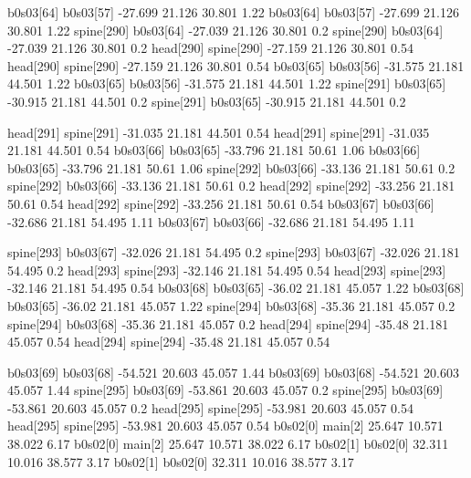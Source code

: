 b0s03[64]    b0s03[57]    -27.699    21.126    30.801    1.22
b0s03[64]    b0s03[57]    -27.699    21.126    30.801    1.22
spine[290]    b0s03[64]    -27.039    21.126    30.801    0.2
spine[290]    b0s03[64]    -27.039    21.126    30.801    0.2
head[290]    spine[290]    -27.159    21.126    30.801    0.54
head[290]    spine[290]    -27.159    21.126    30.801    0.54
b0s03[65]    b0s03[56]    -31.575    21.181    44.501    1.22
b0s03[65]    b0s03[56]    -31.575    21.181    44.501    1.22
spine[291]    b0s03[65]    -30.915    21.181    44.501    0.2
spine[291]    b0s03[65]    -30.915    21.181    44.501    0.2


head[291]    spine[291]    -31.035    21.181    44.501    0.54
head[291]    spine[291]    -31.035    21.181    44.501    0.54
b0s03[66]    b0s03[65]    -33.796    21.181    50.61    1.06
b0s03[66]    b0s03[65]    -33.796    21.181    50.61    1.06
spine[292]    b0s03[66]    -33.136    21.181    50.61    0.2
spine[292]    b0s03[66]    -33.136    21.181    50.61    0.2
head[292]    spine[292]    -33.256    21.181    50.61    0.54
head[292]    spine[292]    -33.256    21.181    50.61    0.54
b0s03[67]    b0s03[66]    -32.686    21.181    54.495    1.11
b0s03[67]    b0s03[66]    -32.686    21.181    54.495    1.11


spine[293]    b0s03[67]    -32.026    21.181    54.495    0.2
spine[293]    b0s03[67]    -32.026    21.181    54.495    0.2
head[293]    spine[293]    -32.146    21.181    54.495    0.54
head[293]    spine[293]    -32.146    21.181    54.495    0.54
b0s03[68]    b0s03[65]    -36.02    21.181    45.057    1.22
b0s03[68]    b0s03[65]    -36.02    21.181    45.057    1.22
spine[294]    b0s03[68]    -35.36    21.181    45.057    0.2
spine[294]    b0s03[68]    -35.36    21.181    45.057    0.2
head[294]    spine[294]    -35.48    21.181    45.057    0.54
head[294]    spine[294]    -35.48    21.181    45.057    0.54


b0s03[69]    b0s03[68]    -54.521    20.603    45.057    1.44
b0s03[69]    b0s03[68]    -54.521    20.603    45.057    1.44
spine[295]    b0s03[69]    -53.861    20.603    45.057    0.2
spine[295]    b0s03[69]    -53.861    20.603    45.057    0.2
head[295]    spine[295]    -53.981    20.603    45.057    0.54
head[295]    spine[295]    -53.981    20.603    45.057    0.54
b0s02[0]    main[2]    25.647    10.571    38.022    6.17
b0s02[0]    main[2]    25.647    10.571    38.022    6.17
b0s02[1]    b0s02[0]    32.311    10.016    38.577    3.17
b0s02[1]    b0s02[0]    32.311    10.016    38.577    3.17



